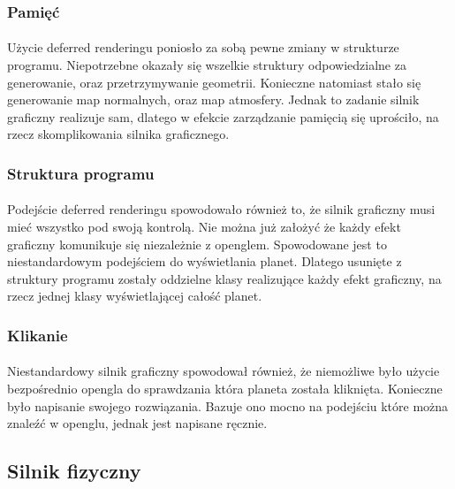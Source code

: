 \subsubsection{Pamięć}\label{ssub:pamiec}
\paragraph{}

Użycie deferred renderingu poniosło za sobą pewne zmiany w strukturze programu. Niepotrzebne okazały się wszelkie struktury odpowiedzialne za generowanie, oraz przetrzymywanie geometrii. Konieczne natomiast stało się generowanie map normalnych, oraz map atmosfery. Jednak to zadanie silnik graficzny realizuje sam, dlatego w efekcie zarządzanie pamięcią się uprościło, na rzecz skomplikowania silnika graficznego.

\subsubsection{Struktura programu}\label{ssub:struktura programu}
\paragraph{}

Podejście deferred renderingu spowodowało również to, że silnik graficzny musi mieć wszystko pod swoją kontrolą. Nie można już założyć że każdy efekt graficzny komunikuje się niezależnie z openglem. Spowodowane jest to niestandardowym podejściem do wyświetlania planet. Dlatego usunięte z struktury programu zostały oddzielne klasy realizujące każdy efekt graficzny, na rzecz jednej klasy wyświetlającej całość planet.

\subsubsection{Klikanie}\label{ssub:klikanie}
\paragraph{}

Niestandardowy silnik graficzny spowodował również, że niemożliwe było użycie bezpośrednio opengla do sprawdzania która planeta została kliknięta. Konieczne było napisanie swojego rozwiązania. Bazuje ono mocno na podejściu które można znaleźć w openglu, jednak jest napisane ręcznie.

\subsection{Silnik fizyczny}\label{sub:silnik fizyczny}
